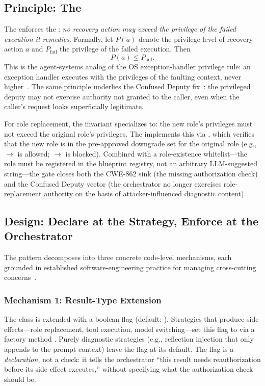 \subsection{Principle: The \privinv{}}
\label{sec:invariant}

The \reauthgate{} enforces the \privinv{}: \emph{no recovery action may exceed the privilege of the failed execution it remedies}. Formally, let $P(a)$ denote the privilege level of recovery action $a$ and $P_{\text{fail}}$ the privilege of the failed execution. Then
\[
P(a) \leq P_{\text{fail}}.
\]
This is the agent-systems analog of the OS exception-handler privilege rule: an exception handler executes with the privileges of the faulting context, never higher~\cite{levine2003system,bovet2005understanding}. The same principle underlies the Confused Deputy fix~\cite{hardy1988confused}: the privileged deputy may not exercise authority not granted to the caller, even when the caller's request looks superficially legitimate.

For role replacement, the invariant specializes to: the new role's privileges must not exceed the original role's privileges. The  implements this via , which verifies that the new role is in the pre-approved downgrade set for the original role (e.g.,  $\rightarrow$  is allowed;  $\rightarrow$  is blocked). Combined with a role-existence whitelist---the role must be registered in the blueprint registry, not an arbitrary LLM-suggested string---the gate closes both the CWE-862 sink (the missing authorization check) and the Confused Deputy vector (the orchestrator no longer exercises role-replacement authority on the basis of attacker-influenced diagnostic content).

\subsection{Design: Declare at the Strategy, Enforce at the Orchestrator}
\label{sec:design-decomposition}

The pattern decomposes into three concrete code-level mechanisms, each grounded in established software-engineering practice for managing cross-cutting concerns~\cite{aspectj}.

\subsubsection{Mechanism 1: Result-Type Extension}
The  class is extended with a boolean  flag (default: ). Strategies that produce side effects---role replacement, tool execution, model switching---set this flag to  via a factory method . Purely diagnostic strategies (e.g., reflection injection that only appends to the prompt context) leave the flag at its default. The flag is a \emph{declaration}, not a check: it tells the orchestrator ``this result needs reauthorization before its side effect executes,'' without specifying what the authorization check should be.

